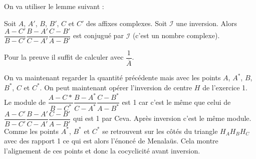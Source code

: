 \begin{sol}

On va utiliser le lemme suivant :

\begin{lem}

Soit $A$, $A'$, $B$, $B'$, $C$ et $C'$ des affixes complexes. Soit $\mathcal{I}$ une inversion. Alors $\dfrac{A-C'}{B-C'}\dfrac{B-A'}{C-A'}\dfrac{C-B'}{A-B'}$ est conjugué par $\mathcal{I}$ (c'est un nombre complexe).
\end{lem}

\begin{preuve}
Pour la preuve il suffit de calculer avec $\dfrac{1}{\overline{A}}$.
\end{preuve}

On va maintenant regarder la quantité précédente mais avec les points $A$, $A^*$, $B$, $B^*$, $C$ et $C^*$. On peut maintenant opérer l'inversion de centre $H$ de l'exercice 1. Le module de $\dfrac{A-C*}{B-C^*}\dfrac{B-A^*}{C-A^*}\dfrac{C-B^*}{A-B^*}$ est 1 car c'est le même que celui de $\dfrac{A-C'}{B-C'}\dfrac{B-A'}{C-A'}\dfrac{C-B'}{A-B'}$ qui est 1 par Ceva. Après inversion c'est le même module. Comme les points $A^*$, $B^*$ et $C^*$ se retrouvent sur les côtés du triangle $H_AH_BH_C$ avec des rapport 1 ce qui est alors l'énoncé de Menalaüs. Cela montre l'alignement de ces points et donc la cocyclicité avant inversion.


\end{sol}

